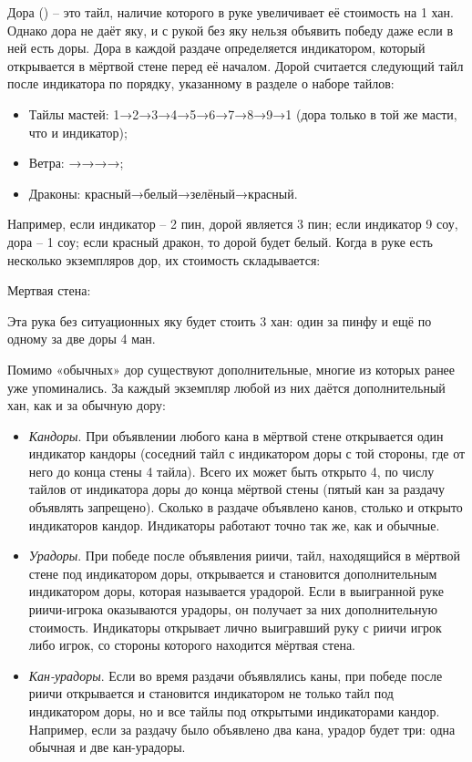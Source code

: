 Дора () – это тайл, наличие которого в руке увеличивает её стоимость на 1 хан. Однако дора не даёт яку, и с рукой без яку нельзя объявить победу даже если в ней есть доры. Дора в каждой раздаче определяется индикатором, который открывается в мёртвой стене перед её началом. Дорой считается следующий тайл после индикатора по порядку, указанному в разделе о наборе тайлов:
\begin{itemize}
	\item Тайлы мастей: 1→2→3→4→5→6→7→8→9→1 (дора только в той же масти, что и индикатор);
	\item Ветра: →→→→;
	\item Драконы: красный→белый→зелёный→красный.
\end{itemize}

Например, если индикатор – 2 пин, дорой является 3 пин; если индикатор 9 соу, дора – 1 соу; если красный дракон, то дорой будет белый.
Когда в руке есть несколько экземпляров дор, их стоимость складывается:


Мертвая стена:

Эта рука без ситуационных яку будет стоить 3 хан: один за пинфу и ещё по одному за две доры 4 ман.

Помимо «обычных» дор существуют дополнительные, многие из которых ранее уже упоминались. За каждый экземпляр любой из них даётся дополнительный хан, как и за обычную дору:
\begin{itemize}
	\item \textit{Кандоры}. При объявлении любого кана в мёртвой стене открывается один индикатор кандоры (соседний тайл с индикатором доры с той стороны, где от него до конца стены 4 тайла). Всего их может быть открыто 4, по числу тайлов от индикатора доры до конца мёртвой стены (пятый кан за раздачу объявлять запрещено). Сколько в раздаче объявлено канов, столько и открыто индикаторов кандор. Индикаторы работают точно так же, как и обычные.
	\item \textit{Урадоры}. При победе после объявления риичи, тайл, находящийся в мёртвой стене под индикатором доры, открывается и становится дополнительным индикатором доры, которая называется урадорой. Если в выигранной руке риичи-игрока оказываются урадоры, он получает за них дополнительную стоимость. Индикаторы открывает лично выигравший руку с риичи игрок либо игрок, со стороны которого находится мёртвая стена.
	\item \textit{Кан-урадоры}. Если во время раздачи объявлялись каны, при победе после риичи открывается и становится индикатором не только тайл под индикатором доры, но и все тайлы под открытыми индикаторами кандор. Например, если за раздачу было объявлено два кана, урадор будет три: одна обычная и две кан-урадоры.
\end{itemize}

